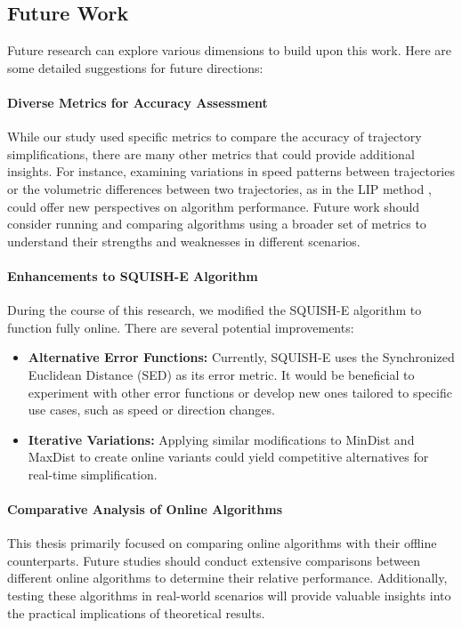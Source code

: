 \subsection*{Future Work}

Future research can explore various dimensions to build upon this work. Here are some detailed suggestions for future directions:

\paragraph{Diverse Metrics for Accuracy Assessment}
While our study used specific metrics to compare the accuracy of trajectory simplifications, there are many other metrics that could provide additional insights. For instance, examining variations in speed patterns between trajectories or the volumetric differences between two trajectories, as in the LIP method \cite{4438678}, could offer new perspectives on algorithm performance. Future work should consider running and comparing algorithms using a broader set of metrics to understand their strengths and weaknesses in different scenarios.

\paragraph{Enhancements to SQUISH-E Algorithm}
During the course of this research, we modified the SQUISH-E algorithm to function fully online. There are several potential improvements:
\begin{itemize}
    \item \textbf{Alternative Error Functions:} Currently, SQUISH-E uses the Synchronized Euclidean Distance (SED) as its error metric. It would be beneficial to experiment with other error functions or develop new ones tailored to specific use cases, such as speed or direction changes.
    \item \textbf{Iterative Variations:} Applying similar modifications to MinDist and MaxDist to create online variants could yield competitive alternatives for real-time simplification.
\end{itemize}

\paragraph{Comparative Analysis of Online Algorithms}
This thesis primarily focused on comparing online algorithms with their offline counterparts. Future studies should conduct extensive comparisons between different online algorithms to determine their relative performance. Additionally, testing these algorithms in real-world scenarios will provide valuable insights into the practical implications of theoretical results.

